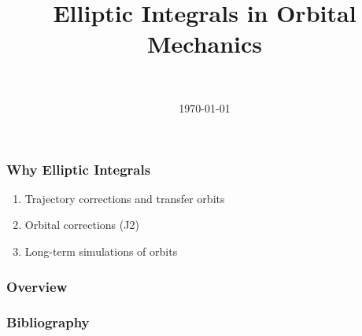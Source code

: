 \documentclass[]{beamer}
\title[Elliptic Integrals in Orbital Mechanics]{Elliptic Integrals in Orbital Mechanics}
\author[Daniel Topa]{\TopaHII \\ \TopaHIIEmail}
\institute{\missiontech}
\date{\today}
\begin{document}
\begin{frame}
	\titlepage
\end{frame}

\begin{frame}\frametitle{Why Elliptic Integrals}
\begin{enumerate}
	\item Trajectory corrections and transfer orbits
	\item Orbital corrections (J2)
	\item Long-term simulations of orbits 
\end{enumerate}
\end{frame}

\begin{frame}\frametitle{Overview}
	\tableofcontents[hideallsubsections]
\end{frame}

	
	
	
	

{\tiny{
\begin{frame}[allowframebreaks]\frametitle{Bibliography}
	\printbibliography
\end{frame}}}

\begin{frame}
	\titlepage
\end{frame}
\end{document}
